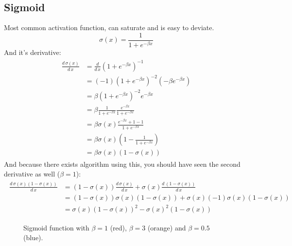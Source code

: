 \subsection{Sigmoid}\label{sec:sigmoid}
Most common activation function, can saturate and is easy to deviate.
\begin{equation}\label{ed:sigmoid}
\sigma(x) = \frac{1}{1 + e^{-\beta x}}
\end{equation}
And it's derivative:
\begin{align}\label{ed:sigmoid_derivative}
\begin{split}
\frac{d\,\sigma(x)}{d\,x} &= \frac{d}{d\,x} (1 + e^{-\beta x})^{-1}\\
&= (-1) (1 + e^{-\beta x})^{-2} (-\beta e^{-\beta x})\\
&= \beta (1 + e^{-\beta x})^{-2} e^{-\beta x}\\
&= \beta \frac{1}{1 + e^{-\beta x}} \frac{e^{-\beta x}}{1 + e^{-\beta x}}\\
&= \beta \sigma(x) \frac{e^{-\beta x} + 1 - 1}{1 + e^{-\beta x}}\\
&= \beta \sigma(x) (1 - \frac{1}{1 + e^{-\beta x}})\\
&= \beta \sigma(x) (1 - \sigma(x))
\end{split}
\end{align}
And because there exists algorithm using this, you should have seen the second derivative as well ($\beta=1$):
\begin{align}
\begin{split}
\frac{d\,\sigma(x)(1-\sigma(x))}{d\,x} &= (1-\sigma(x)) \frac{d\,\sigma(x)}{d\,x} + \sigma(x) \frac{d\,(1-\sigma(x))}{d\,x}\\
&= (1-\sigma(x)) \sigma(x) (1 - \sigma(x)) + \sigma(x) (-1) \sigma(x) (1 - \sigma(x))\\
&= \sigma(x) (1 - \sigma(x))^2 - \sigma(x)^2 (1 - \sigma(x))
\end{split}
\end{align}

\begin{figure}
\centering
{}
\caption{Sigmoid function with $\beta=1$ (red), $\beta=3$ (orange) and $\beta=0.5$ (blue).}
\end{figure}

